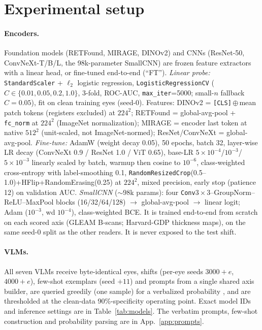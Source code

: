 \section{Experimental setup}
\label{app:setup}

\paragraph{Encoders.} Foundation models (RETFound, MIRAGE, DINOv2) and CNNs (ResNet-50, ConvNeXt-T/B/L, the
98k-parameter SmallCNN) are frozen feature extractors with a linear head, or fine-tuned end-to-end (``FT'').
\emph{Linear probe:} \texttt{StandardScaler} + $\ell_2$ logistic regression, \texttt{LogisticRegressionCV}
($C\in\{0.01,0.05,0.2,1.0\}$, 3-fold, ROC-AUC, \texttt{max\_iter}=5000; small-$n$ fallback $C{=}0.05$), fit on clean
training eyes (seed-0). Features: DINOv2 = \texttt{[CLS]}\,$\oplus$\,mean patch tokens (registers excluded) at
$224^2$; RETFound = global-avg-pool + \texttt{fc\_norm} at $224^2$ (ImageNet normalization); MIRAGE = encoder last
token at native $512^2$ (unit-scaled, not ImageNet-normed); ResNet/ConvNeXt = global-avg-pool. \emph{Fine-tune:}
AdamW (weight decay 0.05), 50 epochs, batch 32, layer-wise LR decay (ConvNeXt 0.9 / ResNet 1.0 / ViT 0.65),
base-LR $5\times10^{-4}$/$10^{-3}$/$5\times10^{-3}$ linearly scaled by batch, warmup then cosine to $10^{-6}$,
class-weighted cross-entropy with label-smoothing 0.1, \texttt{RandomResizedCrop}(0.5--1.0)+HFlip+RandomErasing(0.25)
at $224^2$, mixed precision, early stop (patience 12) on validation AUC. \emph{SmallCNN} ($\sim$98k params):
four \texttt{Conv}$3{\times}3$--GroupNorm--ReLU--MaxPool blocks (16/32/64/128) $\rightarrow$ global-avg-pool
$\rightarrow$ linear logit; Adam ($10^{-3}$, wd $10^{-4}$), class-weighted BCE. It is trained end-to-end from scratch
on each scored axis (GLEAM B-scans; Harvard-GDP thickness maps), on the same seed-0 split as the other readers. It is
never exposed to the test shift.

\paragraph{VLMs.} All seven VLMs receive byte-identical eyes, shifts (per-eye seeds $3000{+}e$, $4000{+}e$), few-shot
exemplars (seed $+11$) and prompts from a single shared axis builder, are queried greedily (one
sample) for a verbalized probability \citep{tian2023calibration}, and are thresholded at the clean-data
90\%-specificity operating point. Exact model IDs and inference settings are in Table~\ref{tab:models}. The verbatim
prompts, few-shot construction and probability parsing are in App.~\ref{app:prompts}.

